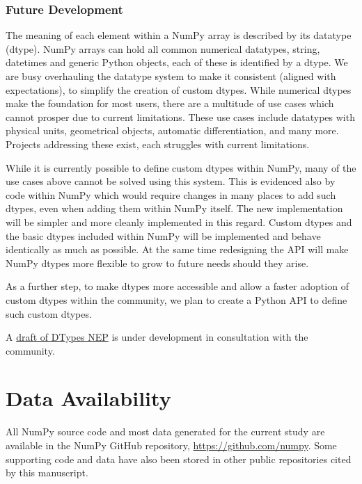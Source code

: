 \documentclass[fleqn,10pt]{wlscirep}
\begin{document}
\subsubsection*{Future Development}


The meaning of each element within a NumPy array is described by its datatype
(dtype). NumPy arrays can hold all common numerical datatypes, string, datetimes
and generic Python objects, each of these is identified by a dtype.
We are busy overhauling the datatype system to make it consistent (aligned with
expectations), to simplify the creation of custom dtypes.
While numerical dtypes make the foundation for most users, there are
a multitude of use cases which cannot prosper due to current limitations.
These use cases include datatypes with physical units\cite{astropy,Goldbaum2018,pint},
geometrical objects\cite{pygeos}, automatic differentiation\cite{pyadolc}, and many more.
Projects addressing these exist, each struggles with current
limitations.  %

While it is currently possible to define custom dtypes within NumPy, many of the
use cases above cannot be solved using this system.
This is evidenced also by code within NumPy which would require changes
in many places to add such dtypes, even when adding them within NumPy itself.
The new implementation will be simpler and more cleanly implemented in
this regard.
Custom dtypes and the basic dtypes included within NumPy will be implemented
and behave identically as much as possible.
At the same time redesigning the API will make NumPy dtypes more flexible to grow
to future needs should they arise.

As a further step, to make dtypes more accessible and allow a faster adoption of
custom dtypes within the community, we plan to create a Python API to
define such custom dtypes.

A \href{https://github.com/numpy/numpy/pull/14422}{draft of DTypes NEP}
is under development in consultation with the community.


\section*{Data Availability}

All NumPy source code and most data generated for the current study are
available in the NumPy GitHub repository, \url{https://github.com/numpy}. Some
supporting code and data have also been stored in other public repositories
cited by this manuscript.
\end{document}
